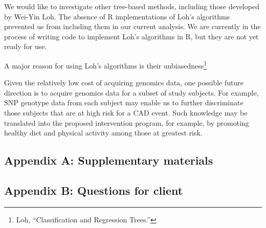 \documentclass[11pt,]{article}
\let\rmarkdownfootnote\footnote%
\def\footnote{\protect\rmarkdownfootnote}
\begin{document}
We would like to investigate other tree-based methods, including those
developed by Wei-Yin Loh. The absence of R implementations of Loh's
algorithms prevented us from including them in our current analysis. We
are currently in the process of writing code to implement Loh's
algorithms in R, but they are not yet ready for use.


A major reason for using Loh's algorithms is their
unbiasedness\footnote{Loh, ``Classification and Regression Trees.'' }

Given the relatively low cost of acquiring genomics data, one possible
future direction is to acquire genomics data for a subset of study
subjects. For example, SNP genotype data from each subject may enable us
to further discriminate those subjects that are at high risk for a CAD
event. Such knowledge may be translated into the proposed intervention
program, for example, by promoting healthy diet and physical activity
among those at greatest risk.

\newpage

\subsection{Appendix A: Supplementary
materials}\label{appendix-a-supplementary-materials}

\newpage 

\subsection{Appendix B: Questions for
client}\label{appendix-b-questions-for-client}
\end{document}
